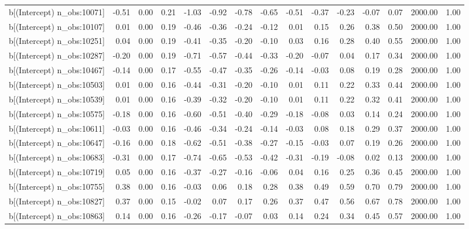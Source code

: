 \begin{table}[ht]
\begin{tabular}{rrrrrrrrrrrrrrr}
  b[(Intercept) n\_obs:10071] & -0.51 & 0.00 & 0.21 & -1.03 & -0.92 & -0.78 & -0.65 & -0.51 & -0.37 & -0.23 & -0.07 & 0.07 & 2000.00 & 1.00 \\ 
  b[(Intercept) n\_obs:10107] & 0.01 & 0.00 & 0.19 & -0.46 & -0.36 & -0.24 & -0.12 & 0.01 & 0.15 & 0.26 & 0.38 & 0.50 & 2000.00 & 1.00 \\ 
  b[(Intercept) n\_obs:10251] & 0.04 & 0.00 & 0.19 & -0.41 & -0.35 & -0.20 & -0.10 & 0.03 & 0.16 & 0.28 & 0.40 & 0.55 & 2000.00 & 1.00 \\ 
  b[(Intercept) n\_obs:10287] & -0.20 & 0.00 & 0.19 & -0.71 & -0.57 & -0.44 & -0.33 & -0.20 & -0.07 & 0.04 & 0.17 & 0.34 & 2000.00 & 1.00 \\ 
  b[(Intercept) n\_obs:10467] & -0.14 & 0.00 & 0.17 & -0.55 & -0.47 & -0.35 & -0.26 & -0.14 & -0.03 & 0.08 & 0.19 & 0.28 & 2000.00 & 1.00 \\ 
  b[(Intercept) n\_obs:10503] & 0.01 & 0.00 & 0.16 & -0.44 & -0.31 & -0.20 & -0.10 & 0.01 & 0.11 & 0.22 & 0.33 & 0.44 & 2000.00 & 1.00 \\ 
  b[(Intercept) n\_obs:10539] & 0.01 & 0.00 & 0.16 & -0.39 & -0.32 & -0.20 & -0.10 & 0.01 & 0.11 & 0.22 & 0.32 & 0.41 & 2000.00 & 1.00 \\ 
  b[(Intercept) n\_obs:10575] & -0.18 & 0.00 & 0.16 & -0.60 & -0.51 & -0.40 & -0.29 & -0.18 & -0.08 & 0.03 & 0.14 & 0.24 & 2000.00 & 1.00 \\ 
  b[(Intercept) n\_obs:10611] & -0.03 & 0.00 & 0.16 & -0.46 & -0.34 & -0.24 & -0.14 & -0.03 & 0.08 & 0.18 & 0.29 & 0.37 & 2000.00 & 1.00 \\ 
  b[(Intercept) n\_obs:10647] & -0.16 & 0.00 & 0.18 & -0.62 & -0.51 & -0.38 & -0.27 & -0.15 & -0.03 & 0.07 & 0.19 & 0.26 & 2000.00 & 1.00 \\ 
  b[(Intercept) n\_obs:10683] & -0.31 & 0.00 & 0.17 & -0.74 & -0.65 & -0.53 & -0.42 & -0.31 & -0.19 & -0.08 & 0.02 & 0.13 & 2000.00 & 1.00 \\ 
  b[(Intercept) n\_obs:10719] & 0.05 & 0.00 & 0.16 & -0.37 & -0.27 & -0.16 & -0.06 & 0.04 & 0.16 & 0.25 & 0.36 & 0.45 & 2000.00 & 1.00 \\ 
  b[(Intercept) n\_obs:10755] & 0.38 & 0.00 & 0.16 & -0.03 & 0.06 & 0.18 & 0.28 & 0.38 & 0.49 & 0.59 & 0.70 & 0.79 & 2000.00 & 1.00 \\ 
  b[(Intercept) n\_obs:10827] & 0.37 & 0.00 & 0.15 & -0.02 & 0.07 & 0.17 & 0.26 & 0.37 & 0.47 & 0.56 & 0.67 & 0.78 & 2000.00 & 1.00 \\ 
  b[(Intercept) n\_obs:10863] & 0.14 & 0.00 & 0.16 & -0.26 & -0.17 & -0.07 & 0.03 & 0.14 & 0.24 & 0.34 & 0.45 & 0.57 & 2000.00 & 1.00 \\ 

\end{tabular}
\end{table}
